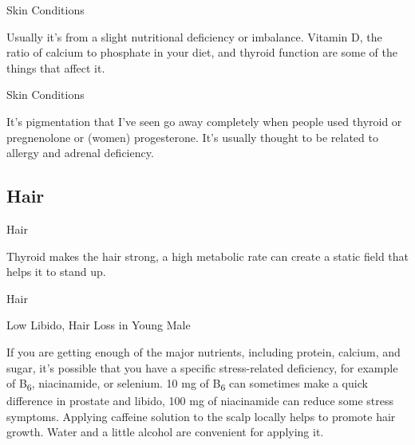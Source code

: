 \documentclass[11pt,oneside,openany,extrafontsizes]{memoir}
\begin{document}
\begin{standalonequote}{Skin Conditions}

    \begin{answer}
      Usually it's from a slight nutritional deficiency or imbalance. Vitamin D, the ratio of calcium to phosphate in your diet, and thyroid function are some of the things that affect it.
    \end{answer}
\end{standalonequote}

\begin{standalonequote}{Skin Conditions}

    \begin{answer}
      It's pigmentation that I've seen go away completely when people used thyroid or pregnenolone or (women) progesterone. It's usually thought to be related to allergy and adrenal deficiency.
    \end{answer}
\end{standalonequote}

\subsection{Hair}

\begin{standalonequote}{Hair}

    \begin{answer}
        Thyroid makes the hair strong, a high metabolic rate can create a static field that helps it to stand up.
    \end{answer}
\end{standalonequote}

\begin{standalonequote}{Hair}
    \begin{note}
        Low Libido, Hair Loss in Young Male
    \end{note}

    \begin{answer}
        If you are getting enough of the major nutrients, including protein, calcium, and sugar, it's possible that you have a specific stress-related deficiency, for example of B\textsubscript{6}, niacinamide, or selenium. 10 mg of B\textsubscript{6} can sometimes make a quick difference in prostate and libido, 100 mg of niacinamide can reduce some stress symptoms. Applying caffeine solution to the scalp locally helps to promote hair growth. Water and a little alcohol are convenient for applying it.
    \end{answer}
\end{standalonequote}
\end{document}
